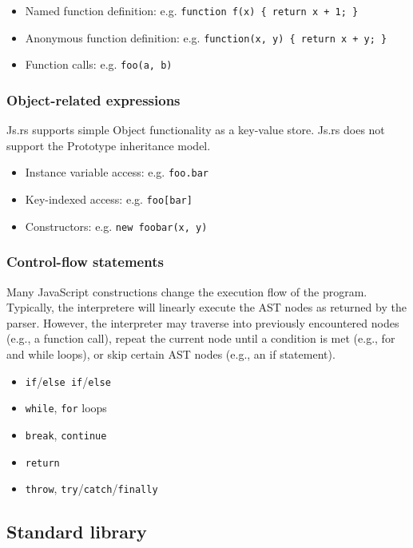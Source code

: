 \documentclass{article}
\begin{document}
\begin{multicols}{2}
\begin{itemize}
  \item Named function definition: e.g. \texttt{function f(x) \{ return x + 1; \} }
  \item Anonymous function definition: e.g. \texttt{function(x, y) \{ return x + y; \} }
  \item Function calls: e.g. \texttt{foo(a, b)}
\end{itemize}

\subsubsection*{Object-related expressions}

Js.rs supports simple Object functionality as a key-value store. Js.rs does not
support the Prototype inheritance model.

\begin{itemize}
  \item Instance variable access: e.g. \texttt{foo.bar}
  \item Key-indexed access: e.g. \texttt{foo[bar]}
  \item Constructors: e.g. \texttt{new foobar(x, y)}
\end{itemize}

\subsubsection*{Control-flow statements}

Many JavaScript constructions change the execution flow of the program.
Typically, the interpretere will linearly execute the AST nodes as returned by
the parser. However, the interpreter may traverse into previously encountered
nodes (e.g., a function call), repeat the current node until a condition is met
(e.g., for and while loops), or skip certain AST nodes (e.g., an if statement).

\begin{itemize}
  \item \texttt{if}/\texttt{else if}/\texttt{else}
  \item \texttt{while}, \texttt{for} loops
  \item \texttt{break}, \texttt{continue}
  \item \texttt{return}
  \item \texttt{throw}, \texttt{try}/\texttt{catch}/\texttt{finally}
\end{itemize}

\subsection*{Standard library}


\end{multicols}
\end{document}
